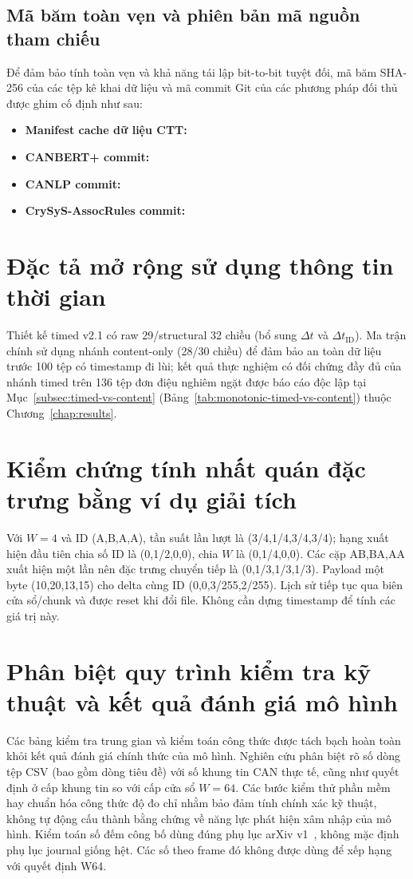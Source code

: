 \documentclass[12pt, a4paper, reqno, oneside]{book}
\begin{document}
\subsection{Mã băm toàn vẹn và phiên bản mã nguồn tham chiếu}\label{subsec:app-hashes}
Để đảm bảo tính toàn vẹn và khả năng tái lập bit-to-bit tuyệt đối, mã băm SHA-256 của các tệp kê khai dữ liệu và mã commit Git của các phương pháp đối thủ được ghim cố định như sau:
\begin{itemize}
\item \textbf{Manifest cache dữ liệu CTT:} \texttt{}
\item \textbf{CANBERT+ commit:} \texttt{}
\item \textbf{CANLP commit:} \texttt{}
\item \textbf{CrySyS-AssocRules commit:} \texttt{}
\end{itemize}

\section{Đặc tả mở rộng sử dụng thông tin thời gian}
Thiết kế timed v2.1 có raw 29/structural 32 chiều (bổ sung $\Delta t$ và $\Delta t_{\text{ID}}$). Ma trận chính sử dụng nhánh content-only (28/30 chiều) để đảm bảo an toàn dữ liệu trước 100 tệp có timestamp đi lùi; kết quả thực nghiệm có đối chứng đầy đủ của nhánh timed trên 136 tệp đơn điệu nghiêm ngặt được báo cáo độc lập tại Mục~\ref{subsec:timed-vs-content} (Bảng~\ref{tab:monotonic-timed-vs-content}) thuộc Chương~\ref{chap:results}.
\section{Kiểm chứng tính nhất quán đặc trưng bằng ví dụ giải tích}
Với $W=4$ và ID (A,B,A,A), tần suất lần lượt là (3/4,1/4,3/4,3/4); hạng xuất hiện đầu tiên chia số ID là (0,1/2,0,0), chia $W$ là (0,1/4,0,0). Các cặp AB,BA,AA xuất hiện một lần nên đặc trưng chuyển tiếp là (0,1/3,1/3,1/3). Payload một byte (10,20,13,15) cho delta cùng ID (0,0,3/255,2/255). Lịch sử tiếp tục qua biên cửa sổ/chunk và được reset khi đổi file. Không cần dựng timestamp để tính các giá trị này.
\section{Phân biệt quy trình kiểm tra kỹ thuật và kết quả đánh giá mô hình}
Các bảng kiểm tra trung gian và kiểm toán công thức được tách bạch hoàn toàn khỏi kết quả đánh giá chính thức của mô hình. Nghiên cứu phân biệt rõ số dòng tệp CSV (bao gồm dòng tiêu đề) với số khung tin CAN thực tế, cũng như quyết định ở cấp khung tin so với cấp cửa sổ $W=64$. Các bước kiểm thử phần mềm hay chuẩn hóa công thức độ đo chỉ nhằm bảo đảm tính chính xác kỹ thuật, không tự động cấu thành bằng chứng về năng lực phát hiện xâm nhập của mô hình.
Kiểm toán số đếm công bố dùng đúng phụ lục arXiv v1~\cite{lampe2023appendix}, không mặc định phụ lục journal giống hệt. Các số theo frame đó không được dùng để xếp hạng với quyết định W64.
\end{document}
